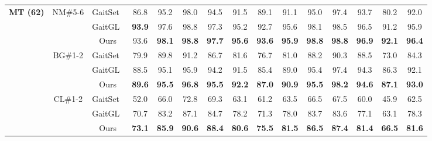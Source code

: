 \documentclass[runningheads]{llncs}
\begin{document}
\begin{table}[ht]
{\begin{tabular}{c|c|c|c|c|c|c|c|c|c|c|c|c|c|c}
    \hline
    \multicolumn{1}{c|}{\multirow{9}[2]{*}{\textbf{MT (62)}}} & \multicolumn{1}{c|}{\multirow{3}[2]{*}{NM\#5-6}} & GaitSet~\cite{aaai2019gaitset} & 86.8  & 95.2  & 98.0  & 94.5  & 91.5  & 89.1  & 91.1  & 95.0  & 97.4  & 93.7  & 80.2  & 92.0   \\
\cline{3-15}          &       & \multicolumn{1}{c|}{GaitGL~\cite{gaitgl}} & \textbf{93.9} & 97.6  & 98.8  & 97.3  & 95.2  & 92.7  & 95.6  & 98.1  & 98.5  & 96.5  & 91.2  & 95.9   \\
\cline{3-15}          &       & Ours  & 93.6  & \textbf{98.1} & \textbf{98.8} & \textbf{97.7} & \textbf{95.6} & \textbf{93.6} & \textbf{95.9} & \textbf{98.8} & \textbf{98.8} & \textbf{96.9} & \textbf{92.1} & \textbf{96.4}  \\
\cline{2-15}          & \multicolumn{1}{c|}{\multirow{3}[2]{*}{BG\#1-2}} & GaitSet~\cite{aaai2019gaitset} & 79.9  & 89.8  & 91.2  & 86.7  & 81.6  & 76.7  & 81.0  & 88.2  & 90.3  & 88.5  & 73.0  & 84.3   \\
\cline{3-15}          &       & \multicolumn{1}{c|}{GaitGL~\cite{gaitgl}} & 88.5  & 95.1  & 95.9  & 94.2  & 91.5  & 85.4  & 89.0  & 95.4  & 97.4  & 94.3  & 86.3  & 92.1   \\
\cline{3-15}          &       & Ours  & \textbf{89.6} & \textbf{95.5} & \textbf{96.8} & \textbf{95.5} & \textbf{92.2} & \textbf{87.0} & \textbf{90.9} & \textbf{95.5} & \textbf{98.2} & \textbf{94.6} & \textbf{87.1} & \textbf{93.0}  \\
\cline{2-15}          & \multicolumn{1}{c|}{\multirow{3}[2]{*}{CL\#1-2}} & GaitSet~\cite{aaai2019gaitset} & 52.0  & 66.0  & 72.8  & 69.3  & 63.1  & 61.2  & 63.5  & 66.5  & 67.5  & 60.0  & 45.9  & 62.5   \\
\cline{3-15}          &       & \multicolumn{1}{c|}{GaitGL~\cite{gaitgl}} & 70.7  & 83.2  & 87.1  & 84.7  & 78.2  & 71.3  & 78.0  & 83.7  & 83.6  & 77.1  & 63.1  & 78.3   \\
\cline{3-15}          &       & Ours  & \textbf{73.1} & \textbf{85.9} & \textbf{90.6} & \textbf{88.4} & \textbf{80.6} & \textbf{75.5} & \textbf{81.5} & \textbf{86.5} & \textbf{87.4} & \textbf{81.4} & \textbf{66.5} & \textbf{81.6}  \\
    \hline


\end{tabular}}
\end{table}
\end{document}
